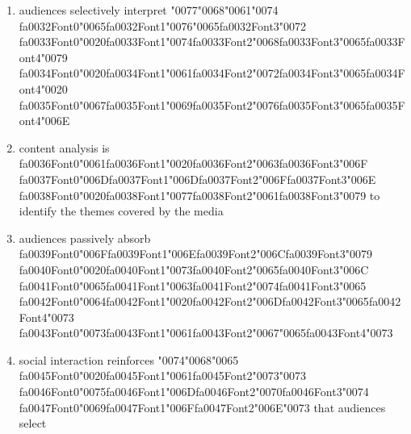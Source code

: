 \documentclass[12pt]{article}
\begin{document}
\begin{enumerate}[label=\arabic*.]
\begin{enumerate}[label=(\alph*)]
    \item audiences selectively interpret {\char"0077}{\char"0068}{\char"0061}{\char"0074} {\csname fa0032Font0\endcsname\char"0065}{\csname fa0032Font1\endcsname\char"0076}{\char"0065}{\csname fa0032Font3\endcsname\char"0072} {\csname fa0033Font0\endcsname\char"0020}{\csname fa0033Font1\endcsname\char"0074}{\csname fa0033Font2\endcsname\char"0068}{\csname fa0033Font3\endcsname\char"0065}{\csname fa0033Font4\endcsname\char"0079} {\csname fa0034Font0\endcsname\char"0020}{\csname fa0034Font1\endcsname\char"0061}{\csname fa0034Font2\endcsname\char"0072}{\csname fa0034Font3\endcsname\char"0065}{\csname fa0034Font4\endcsname\char"0020} {\csname fa0035Font0\endcsname\char"0067}{\csname fa0035Font1\endcsname\char"0069}{\csname fa0035Font2\endcsname\char"0076}{\csname fa0035Font3\endcsname\char"0065}{\csname fa0035Font4\endcsname\char"006E}
    \item content analysis is {\csname fa0036Font0\endcsname\char"0061}{\csname fa0036Font1\endcsname\char"0020}{\csname fa0036Font2\endcsname\char"0063}{\csname fa0036Font3\endcsname\char"006F} {\csname fa0037Font0\endcsname\char"006D}{\csname fa0037Font1\endcsname\char"006D}{\csname fa0037Font2\endcsname\char"006F}{\csname fa0037Font3\endcsname\char"006E} {\csname fa0038Font0\endcsname\char"0020}{\csname fa0038Font1\endcsname\char"0077}{\csname fa0038Font2\endcsname\char"0061}{\csname fa0038Font3\endcsname\char"0079} to identify the themes covered by the media
    \item audiences passively absorb {\csname fa0039Font0\endcsname\char"006F}{\csname fa0039Font1\endcsname\char"006E}{\csname fa0039Font2\endcsname\char"006C}{\csname fa0039Font3\endcsname\char"0079} {\csname fa0040Font0\endcsname\char"0020}{\csname fa0040Font1\endcsname\char"0073}{\csname fa0040Font2\endcsname\char"0065}{\csname fa0040Font3\endcsname\char"006C} {\csname fa0041Font0\endcsname\char"0065}{\csname fa0041Font1\endcsname\char"0063}{\csname fa0041Font2\endcsname\char"0074}{\csname fa0041Font3\endcsname\char"0065} {\csname fa0042Font0\endcsname\char"0064}{\csname fa0042Font1\endcsname\char"0020}{\csname fa0042Font2\endcsname\char"006D}{\csname fa0042Font3\endcsname\char"0065}{\csname fa0042Font4\endcsname\char"0073} {\csname fa0043Font0\endcsname\char"0073}{\csname fa0043Font1\endcsname\char"0061}{\csname fa0043Font2\endcsname\char"0067}{\char"0065}{\csname fa0043Font4\endcsname\char"0073}
    \item social interaction reinforces {\char"0074}{\char"0068}{\char"0065} {\csname fa0045Font0\endcsname\char"0020}{\csname fa0045Font1\endcsname\char"0061}{\csname fa0045Font2\endcsname\char"0073}{\char"0073} {\csname fa0046Font0\endcsname\char"0075}{\csname fa0046Font1\endcsname\char"006D}{\csname fa0046Font2\endcsname\char"0070}{\csname fa0046Font3\endcsname\char"0074} {\csname fa0047Font0\endcsname\char"0069}{\csname fa0047Font1\endcsname\char"006F}{\csname fa0047Font2\endcsname\char"006E}{\char"0073} that audiences select

\end{enumerate}
\end{enumerate}
\end{document}
